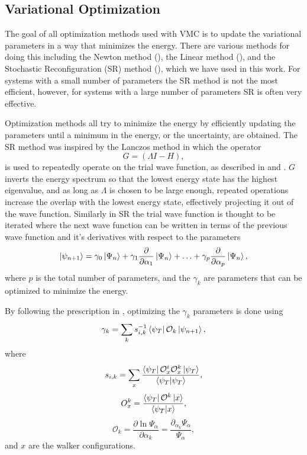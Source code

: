 \subsection{Variational Optimization}
The goal of all optimization methods used with VMC is to update the variational parameters in a way that minimizes the energy. There are various methods for doing this including the Newton method (\cite{casalegno2003,umrigar2005}), the Linear method (\cite{toulouse2007}), and the Stochastic Reconfiguration (SR) method (\cite{casula2004,sorella2001,sorella2005}), which we have used in this work. For systems with a small number of parameters the SR method is not the most efficient, however, for systems with a large number of parameters SR is often very effective.

Optimization methods all try to minimize the energy by efficiently updating the parameters until a minimum in the energy, or the uncertainty, are obtained. The SR method was inspired by the Lanczos method in which the operator
\begin{equation}
   G = \left(\Lambda I - H\right),
\end{equation}
is used to repeatedly operate on the trial wave function, as described in \cite{heeb1994} and \cite{sorella2001}. $G$ inverts the energy spectrum so that the lowest energy state has the highest eigenvalue, and as long as $\Lambda$ is chosen to be large enough, repeated operations increase the overlap with the lowest energy state, effectively projecting it out of the wave function. Similarly in SR the trial wave function is thought to be iterated where the next wave function can be written in terms of the previous wave function and it's derivatives with respect to the parameters
\begin{equation}
   \left| \psi_{n+1} \right> = \gamma_0\left| \Psi_n \right> + \gamma_1\frac{\partial}{\partial \alpha_1}\left| \Psi_n \right> + \ldots + \gamma_p\frac{\partial}{\partial \alpha_p}\left| \Psi_n \right>,
   \label{equ:SRapproxgamma}
\end{equation}
where $p$ is the total number of parameters, and the $\gamma_k$ are parameters that can be optimized to minimize the energy.

By following the prescription in \cite{sorella2001}, optimizing the $\gamma_k$ parameters is done using
\begin{equation}
   \gamma_k = \sum\limits_k s^{-1}_{i,k} \left< \psi_T \right|\mathcal{O}_k\left| \psi_{n+1} \right>,
\end{equation}
where
\begin{equation}
   s_{i,k} = \sum\limits_x \frac{\left< \psi_T \right|\mathcal{O}^i_x\mathcal{O}^k_x\left| \psi_T \right>}{\left< \psi_T | \psi_T \right>},
\end{equation}
\begin{equation}
   O^k_x = \frac{\left< \psi_T \right|\mathcal{O}^k\left| x \right>}{\left< \psi_T | x \right>},
\end{equation}
\begin{equation}
   \mathcal{O}_k = \frac{\partial \ln \Psi_\alpha}{\partial \alpha_k} = \frac{\partial_{\alpha_k} \Psi_\alpha}{\Psi_\alpha},
\end{equation}
and $x$ are the walker configurations.

